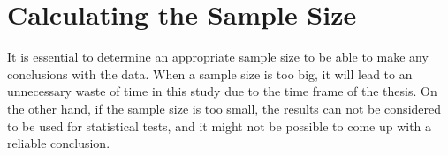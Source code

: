 



  
  \section{Calculating the Sample Size} \label{sec:samplesize}

    It is essential to determine an appropriate sample size to be able to make any conclusions with the data. When a sample size is too big, it will lead to an unnecessary waste of time in this study due to the time frame of the thesis. On the other hand, if the sample size is too small, the results can not be considered to be used for statistical tests, and it might not be possible to come up with a reliable conclusion.


